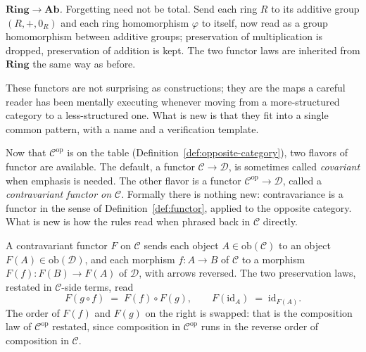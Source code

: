 \begin{example}
\textit{$\mathbf{Ring} \to \mathbf{Ab}$.} Forgetting need not be
total. Send each ring $R$ to its additive group $(R, +, 0_R)$
and each ring homomorphism $\varphi$ to itself, now read as a
group homomorphism between additive groups; preservation of
multiplication is dropped, preservation of addition is kept.
The two functor laws are inherited from $\mathbf{Ring}$ the same
way as before.

These functors are not surprising as constructions; they are the
maps a careful reader has been mentally executing whenever moving
from a more-structured category to a less-structured one. What
is new is that they fit into a single common pattern, with a
name and a verification template.
\end{example}

\begin{remark}\label{rem:contravariant}
Now that $\mathcal{C}^{\mathrm{op}}$ is on the table
(Definition~\ref{def:opposite-category}), two flavors of functor
are available. The default, a functor $\mathcal{C} \to
\mathcal{D}$, is sometimes called \textit{covariant} when
emphasis is needed. The other flavor is a functor
$\mathcal{C}^{\mathrm{op}} \to \mathcal{D}$, called a
\textit{contravariant functor on
$\mathcal{C}$}. Formally there is
nothing new: contravariance is a functor in the sense of
Definition~\ref{def:functor}, applied to the opposite category.
What is new is how the rules read when phrased back in
$\mathcal{C}$ directly.

A contravariant functor $F$ on $\mathcal{C}$ sends each object
$A \in \mathrm{ob}(\mathcal{C})$ to an object $F(A) \in
\mathrm{ob}(\mathcal{D})$, and each morphism $f : A \to B$ of
$\mathcal{C}$ to a morphism $F(f) : F(B) \to F(A)$ of
$\mathcal{D}$, with arrows reversed. The two preservation laws,
restated in $\mathcal{C}$-side terms, read
\[ F(g \circ f) \; = \; F(f) \circ F(g), \qquad
   F(\mathrm{id}_A) \; = \; \mathrm{id}_{F(A)}. \]
The order of $F(f)$ and $F(g)$ on the right is swapped: that is
the composition law of $\mathcal{C}^{\mathrm{op}}$ restated, since
composition in $\mathcal{C}^{\mathrm{op}}$ runs in the reverse
order of composition in $\mathcal{C}$.


\end{remark}
